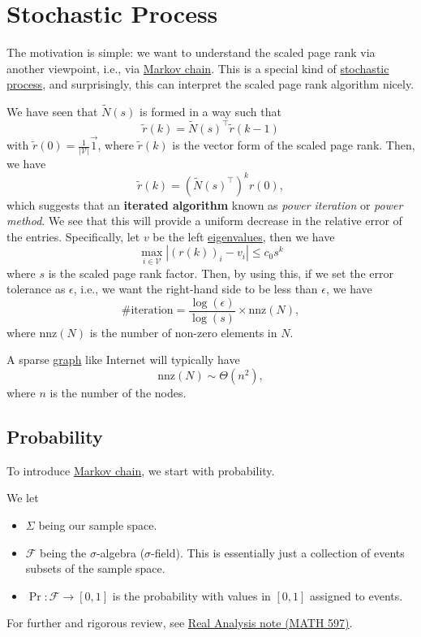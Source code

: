 \chapter{Stochastic Process}
The motivation is simple: we want to understand the scaled page rank via another viewpoint, i.e., via \hyperref[def:Markov-chain]{Markov chain}. This is a special kind of \hyperref[def:stochastic-process]{stochastic process}, and surprisingly, this can interpret the scaled page rank algorithm nicely.

\begin{prev}
	We have seen that \(\widetilde{N}(s)\) is formed in a way such that
	\[
		\widetilde{r}(k) = \widetilde{N}(s)^{\top}\widetilde{r}(k - 1)
	\]
	with \(\widetilde{r}(0) = \frac{1}{\left\vert \mathcal{V} \right\vert }\vec{1}\), where \(\widetilde{r}(k)\) is the vector form of the scaled page rank. Then, we have
	\[
		\widetilde{r}(k) = \left(\widetilde{N}(s)^{\top}\right)^k r(0),
	\]
	which suggests that an \textbf{iterated algorithm} known as \emph{power iteration} or \emph{power method}. We see that this will provide a uniform decrease in the relative error of the entries. Specifically, let \(v\) be the left \hyperref[def:eigenvalue]{eigenvalues}, then we have
	\[
		\max_{i\in \mathcal{V}}\left\vert (r(k))_i - v_i\right\vert \leq c_0 s^k
	\]
	where \(s\) is the scaled page rank factor. Then, by using this, if we set the error tolerance as \(\epsilon\), i.e., we want the right-hand side to be less than \(\epsilon \), we have
	\[
		\#\text{iteration} = \frac{\log(\epsilon)}{\log(s)}\times \mathrm{nnz}(N),
	\]
	where \(\mathrm{nnz}(N)\) is the number of non-zero elements in \(N\).
	\begin{remark}
		A sparse \hyperref[def:graph]{graph} like Internet will typically have
		\[
			\mathrm{nnz}(N)\sim\Theta(n^2),
		\]
		where \(n\) is the number of the nodes.
	\end{remark}
\end{prev}


\section{Probability}
To introduce \hyperref[def:Markov-chain]{Markov chain}, we start with probability.
\begin{prev}
	We let
	\begin{itemize}
		\item \(\Sigma\) being our sample space.
		\item \(\mathcal{F}\) being the \(\sigma\)-algebra (\(\sigma \)-field). This is essentially just a collection of events subsets of the sample space.
		\item \(\Pr \colon \mathcal{F} \to [0, 1]\) is the probability with values in \([0, 1]\) assigned to events.
	\end{itemize}
	For further and rigorous review, see \href{https://www.pbb.wtf/posts/Notes#real-analysis-math597-umich}{Real Analysis note (MATH 597)}.
\end{prev}

